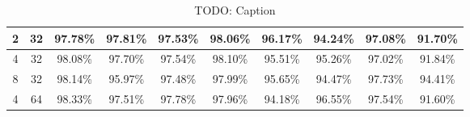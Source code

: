 \begin{table}[h!]
\begin{tabular}{ | c | c | c | c | c | c | c | c | c | c | }
        2 & 32 & 97.78\% & 97.81\% & 97.53\% & 98.06\% & 96.17\% & 94.24\% & 97.08\% & 91.70\% \\\hline
        4 & 32 & 98.08\% & 97.70\% & 97.54\% & 98.10\% & 95.51\% & 95.26\% & 97.02\% & 91.84\% \\\hline
        8 & 32 & 98.14\% & 95.97\% & 97.48\% & 97.99\% & 95.65\% & 94.47\% & 97.73\% & 94.41\% \\\hline
        4 & 64 & 98.33\% & 97.51\% & 97.78\% & 97.96\% & 94.18\% & 96.55\% & 97.54\% & 91.60\% \\\hline
    \end{tabular}
    \caption{TODO: Caption}
    \label{tab:TODO_LABEL}
\end{table}
